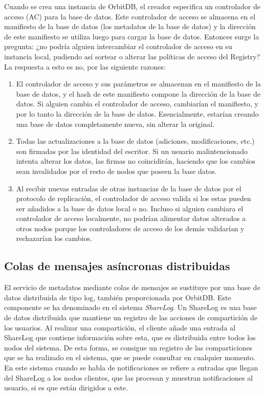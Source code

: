 Cuando se crea una instancia de OrbitDB, el creador especifica un controlador de acceso (AC) para la base de datos.
Este controlador de acceso se almacena en el manifiesto de la base de datos (los metadatos de la base de datos)
y la dirección de este manifiesto se utiliza luego para cargar la base de datos. Entonces surge la pregunta:
¿no podría alguien intercambiar el controlador de acceso en su instancia local, pudiendo así sortear o alterar las políticas de acceso del Registry?
\\
La respuesta a esto es no, por las siguiente razones:
\begin{enumerate}[noitemsep,after=\vspace{-0.4\baselineskip}]
  \item El controlador de acceso y sus parámetros se almacenan en el manifiesto de la base de datos, y el hash de este manifiesto compone la dirección de la base de datos. Si alguien cambia el controlador de acceso, cambiarían el manifiesto, y por lo tanto la dirección de la base de datos. Esencialmente, estarían creando una base de datos completamente nueva, sin alterar la original.
  \item Todas las actualizaciones a la base de datos (adiciones, modificaciones, etc.) son firmadas por las identidad del escritor. Si un usuario malintencionado intenta alterar los datos, las firmas no coincidirán, haciendo que los cambios sean invalidados por el resto de nodos que poseen la base datos.
  \item Al recibir nuevas entradas de otras instancias de la base de datos por el protocolo de replicación, el controlador de acceso valida si los estas pueden ser añadidos a la base de datos local o no. Incluso si alguien cambiara el controlador de acceso localmente, no podrían alimentar datos alterados a otros nodos porque los controladores de acceso de los demás validarían y rechazarían los cambios.
\end{enumerate}

\subsection{Colas de mensajes asíncronas distribuidas}
El servicio de metadatos mediante colas de mensajes se sustituye por una base de datos distribuida de tipo
log, también proporcionada por OrbitDB. Este componente se ha denominado en el sistema \textit{ShareLog}.
Un ShareLog es una base de datos distribuida que mantiene un registro de las acciones de compartición de los usuarios. Al realizar una compartición, el cliente añade una entrada al ShareLog que contiene información sobre esta, que es distribuida entre todos los nodos del sistema. De esta forma, se consigue un registro de las comparticiones que se ha realizado en el sistema, que se puede consultar en cualquier momento. En este sistema cuando se habla
de notificaciones se refiere a entradas que llegan del ShareLog a los nodos clientes, que las procesan y muestran notificaciones al usuario, si es que están dirigidos a este.

